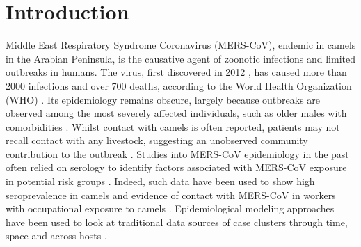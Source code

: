 \documentclass[11pt,oneside,letterpaper]{article}
\def\lmc#1{\textcolor{green}{[#1]}}
\begin{document}
\section*{Introduction}
Middle East Respiratory Syndrome Coronavirus (MERS-CoV), endemic in camels in the Arabian Peninsula, is the causative agent of zoonotic infections and limited outbreaks in humans. %
The virus, first discovered in 2012 \citep{zaki_isolation_2012,boheemen_genomic_2012}, has caused more than 2000  infections and over 700 deaths, according to the World Health Organization (WHO) \citep{who_2017}.
Its epidemiology remains obscure, largely because outbreaks are observed among the most severely affected individuals, such as older males with comorbidities \citep{assiri_2013,group_state_2013}.
Whilst contact with camels is often reported, patients may not recall contact with %
any livestock, suggesting an unobserved community contribution to the outbreak \citep{group_state_2013}.
Studies into MERS-CoV epidemiology in the past often relied on serology to identify factors associated with MERS-CoV exposure in potential risk groups \citep{reusken_occupational_2015,reusken_2013}.
Indeed, such data have been used to show high seroprevalence in camels \citep{muller_2014,corman_antibodies_2014,chu_2014,reusken_2013,reusken_2014} and evidence of contact with MERS-CoV in workers with occupational exposure to camels \citep{reusken_occupational_2015,muller_presence_2015}.
Epidemiological modeling approaches have been used to look at traditional data sources of case clusters through time, space and across hosts \citep{cauchemez_unraveling_2016}.
\end{document}
